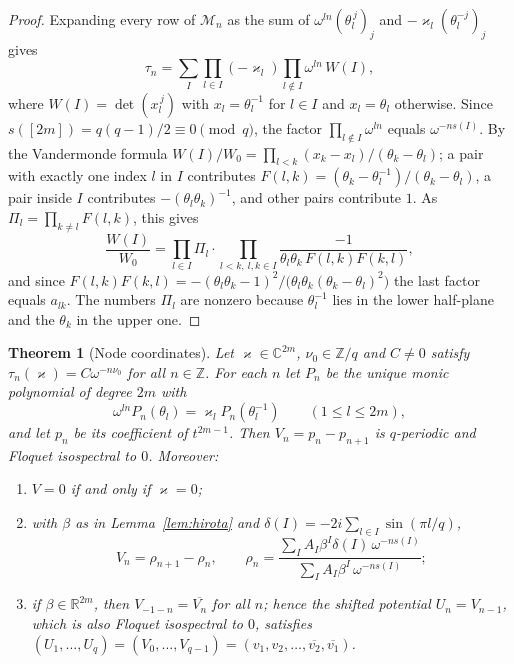 \documentclass[11pt,reqno]{amsart}
\newtheorem{theorem}{Theorem}[section]
\theoremstyle{definition}
\theoremstyle{remark}
\newcommand{\C}{\mathbb C}
\newcommand{\Z}{\mathbb Z}
\newcommand{\R}{\mathbb R}
\begin{document}
\begin{proof}
Expanding every row of $\mathcal M_n$ as the sum of $\omega^{ln}(\theta_l^{\,j})_j$ and
$-\varkappa_l(\theta_l^{-j})_j$ gives
\[
 \tau_n=\sum_I\prod_{l\in I}(-\varkappa_l)\prod_{l\notin I}\omega^{ln}\,W(I),
\]
where $W(I)=\det(x_l^{\,j})$ with $x_l=\theta_l^{-1}$ for $l\in I$ and
$x_l=\theta_l$ otherwise.  Since $s([2m])=q(q-1)/2\equiv0\pmod q$, the factor
$\prod_{l\notin I}\omega^{ln}$ equals $\omega^{-ns(I)}$.  By the Vandermonde
formula $W(I)/W_0=\prod_{l<k}(x_k-x_l)/(\theta_k-\theta_l)$; a pair with exactly
one index $l$ in $I$ contributes $F(l,k)=(\theta_k-\theta_l^{-1})/(\theta_k-\theta_l)$,
a pair inside $I$ contributes $-(\theta_l\theta_k)^{-1}$, and other pairs
contribute $1$.  As $\Pi_l=\prod_{k\ne l}F(l,k)$, this gives
\[
 \frac{W(I)}{W_0}=\prod_{l\in I}\Pi_l\cdot\prod_{l<k,\ l,k\in I}
 \frac{-1}{\theta_l\theta_k\,F(l,k)F(k,l)} ,
\]
and since $F(l,k)F(k,l)=-(\theta_l\theta_k-1)^2/\bigl(\theta_l\theta_k(\theta_k-\theta_l)^2\bigr)$
the last factor equals $a_{lk}$.  The numbers $\Pi_l$ are nonzero because
$\theta_l^{-1}$ lies in the lower half-plane and the $\theta_k$ in the upper one.
\end{proof}

\begin{theorem}[Node coordinates]\label{thm:nodes}
Let $\varkappa\in\C^{2m}$, $\nu_0\in\Z/q$ and $C\ne0$ satisfy
$\tau_n(\varkappa)=C\omega^{-n\nu_0}$ for all $n\in\Z$.  For each $n$ let $P_n$
be the unique monic polynomial of degree $2m$ with
\begin{equation}\label{eq:node}
 \omega^{ln}P_n(\theta_l)=\varkappa_lP_n(\theta_l^{-1})\qquad(1\le l\le 2m),
\end{equation}
and let $p_n$ be its coefficient of $t^{2m-1}$.  Then $V_n=p_n-p_{n+1}$ is
$q$-periodic and Floquet isospectral to $0$.  Moreover:
\begin{enumerate}[label=\textup{(\alph*)}]
\item $V=0$ if and only if $\varkappa=0$;
\item with $\beta$ as in Lemma~\ref{lem:hirota} and $\delta(I)=-2i\sum_{l\in I}\sin(\pi l/q)$,
\[
 V_n=\rho_{n+1}-\rho_n,\qquad
 \rho_n=\frac{\sum_IA_I\beta^I\delta(I)\,\omega^{-ns(I)}}{\sum_IA_I\beta^I\,\omega^{-ns(I)}};
\]
\item if $\beta\in\R^{2m}$, then $V_{-1-n}=\overline{V_n}$ for all $n$; hence the
shifted potential $U_n=V_{n-1}$, which is also Floquet isospectral to $0$,
satisfies $(U_1,\dots,U_q)=(V_0,\dots,V_{q-1})=(v_1,v_2,\dots,\overline{v_2},\overline{v_1})$.
\end{enumerate}
\end{theorem}
\end{document}
